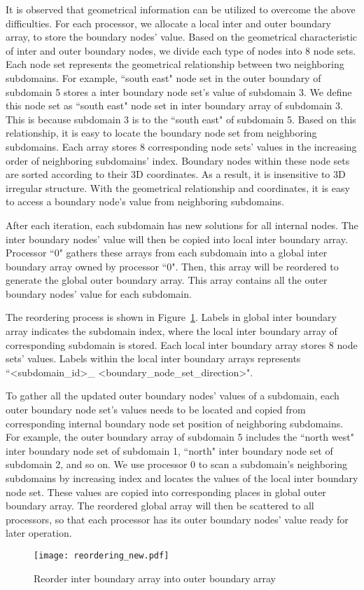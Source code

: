 \documentclass{sig-alternate}
\begin{document}
	It is observed that geometrical information can be utilized to overcome the above difficulties. For each processor, we allocate 
	a local inter and outer boundary array, to store the boundary nodes' value. Based on the geometrical 
	characteristic of inter and outer boundary nodes, we divide each type of nodes into 8 node sets. Each node set represents the
	geometrical relationship between two neighboring subdomains. For example, ``south east" node set in the outer boundary of 
	subdomain 5 stores a inter boundary node set's value of subdomain 3. We define this node set as ``south east" node set in inter
	boundary array of subdomain 3. This is because subdomain 3 is to the ``south east" of subdomain 5. Based on this relationship,
	it is easy to locate the boundary node set from neighboring subdomains. Each array stores 8 corresponding node sets' values in 
	the increasing order of neighboring subdomains' index.  Boundary nodes within 
	these node sets are sorted according to their 3D coordinates. As a result, it is insensitive to 3D irregular structure. With the
	geometrical relationship and coordinates, it is easy to access a boundary node's value from neighboring subdomains. 

	After each iteration, each subdomain has new solutions for all internal nodes. The inter 
	boundary nodes' value will then be copied into local inter boundary array. Processor ``0" gathers these arrays from each subdomain
	into a global inter boundary array owned by processor ``0". Then, this array will be reordered to generate the global outer 
	boundary array. This array
	contains all the outer boundary nodes' value for each subdomain. 

	The reordering process is shown in Figure~\ref{Fig4}. Labels in global inter boundary array indicates the subdomain index, where
	the local inter boundary array of corresponding subdomain is stored. Each local inter boundary array stores 8 node sets' values. 
	Labels within the local inter boundary arrays represents ``<subdomain\_id>\_
	<boundary\_node\_set\_direction>".

	To gather all the updated outer boundary nodes' values of a subdomain, each outer boundary node set's values needs to be located
	and copied from corresponding internal boundary node set position of neighboring subdomains. For example, the 
	outer boundary array of subdomain 5 includes the ``north west" inter boundary node set of subdomain 1, ``north" inter boundary 
	node set of 
	subdomain 2, and so on. We use processor 0 to scan a subdomain's neighboring subdomains by increasing index and locates the
	values of the 
	local inter boundary node set. These values are copied into corresponding places in global outer boundary array. The 
	reordered global array will then be scattered to all processors, so that each processor has its outer boundary nodes' value 
	ready for later operation. 
	\begin{figure}[htbp]
	  \centering
	  \texttt{[image: reordering\_new.pdf]}
	  \caption{Reorder inter boundary array into outer boundary array}
	  \label{Fig4}
	\end{figure}
\end{document}
